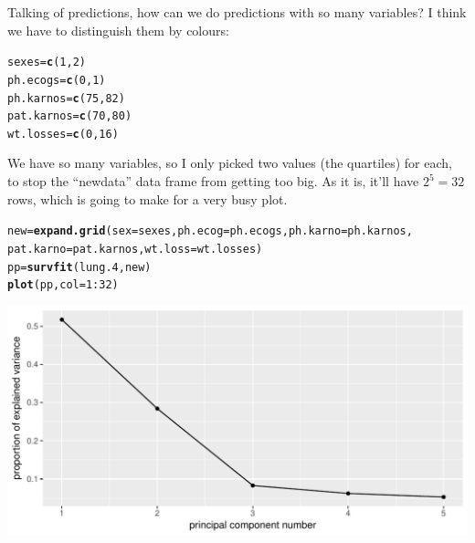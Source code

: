 \documentclass{article}\usepackage[]{graphicx}\usepackage[]{color}
\makeatletter
\def\maxwidth{ %
  \ifdim\Gin@nat@width>\linewidth
    \linewidth
  \else
    \Gin@nat@width
  \fi
}
\newcommand{\hlnum}[1]{\textcolor[rgb]{0.686,0.059,0.569}{#1}}%
\newcommand{\hlopt}[1]{\textcolor[rgb]{0,0,0}{#1}}%
\newcommand{\hlstd}[1]{\textcolor[rgb]{0.345,0.345,0.345}{#1}}%
\newcommand{\hlkwb}[1]{\textcolor[rgb]{0.69,0.353,0.396}{#1}}%
\newcommand{\hlkwc}[1]{\textcolor[rgb]{0.333,0.667,0.333}{#1}}%
\newcommand{\hlkwd}[1]{\textcolor[rgb]{0.737,0.353,0.396}{\textbf{#1}}}%
\newenvironment{kframe}{%
 \def\at@end@of@kframe{}%
 \ifinner\ifhmode%
  \def\at@end@of@kframe{\end{minipage}}%
  \begin{minipage}{\columnwidth}%
 \fi\fi%
 \def\FrameCommand##1{\hskip\@totalleftmargin \hskip-\fboxsep
 \colorbox{shadecolor}{##1}\hskip-\fboxsep
     \hskip-\linewidth \hskip-\@totalleftmargin \hskip\columnwidth}%
 \MakeFramed {\advance\hsize-\width
   \@totalleftmargin\z@ \linewidth\hsize
   \@setminipage}}%
 {\par\unskip\endMakeFramed%
 \at@end@of@kframe}
\newenvironment{knitrout}{}{} %
\makeatother
\begin{document}
Talking of predictions, how can we do predictions with so many
variables? I think we have to distinguish them by colours:

\begin{knitrout}
\color{fgcolor}\begin{kframe}
\begin{alltt}
\hlstd{sexes}\hlkwb{=}\hlkwd{c}\hlstd{(}\hlnum{1}\hlstd{,}\hlnum{2}\hlstd{)}
\hlstd{ph.ecogs}\hlkwb{=}\hlkwd{c}\hlstd{(}\hlnum{0}\hlstd{,}\hlnum{1}\hlstd{)}
\hlstd{ph.karnos}\hlkwb{=}\hlkwd{c}\hlstd{(}\hlnum{75}\hlstd{,}\hlnum{82}\hlstd{)}
\hlstd{pat.karnos}\hlkwb{=}\hlkwd{c}\hlstd{(}\hlnum{70}\hlstd{,}\hlnum{80}\hlstd{)}
\hlstd{wt.losses}\hlkwb{=}\hlkwd{c}\hlstd{(}\hlnum{0}\hlstd{,}\hlnum{16}\hlstd{)}
\end{alltt}
\end{kframe}
\end{knitrout}

We have so many variables, so I only picked two values (the quartiles) for each, to
stop the ``newdata'' data frame from getting too big. As it is, it'll
have $2^5=32$ rows, which is going to make for a very busy plot.

\begin{knitrout}
\color{fgcolor}\begin{kframe}
\begin{alltt}
\hlstd{new}\hlkwb{=}\hlkwd{expand.grid}\hlstd{(}\hlkwc{sex}\hlstd{=sexes,}\hlkwc{ph.ecog}\hlstd{=ph.ecogs,}\hlkwc{ph.karno}\hlstd{=ph.karnos,}
  \hlkwc{pat.karno}\hlstd{=pat.karnos,}\hlkwc{wt.loss}\hlstd{=wt.losses)}
\hlstd{pp}\hlkwb{=}\hlkwd{survfit}\hlstd{(lung.4,new)}
\hlkwd{plot}\hlstd{(pp,}\hlkwc{col}\hlstd{=}\hlnum{1}\hlopt{:}\hlnum{32}\hlstd{)}
\end{alltt}
\end{kframe}
\includegraphics[width=\maxwidth]{figure/unnamed-chunk-17-1} 

\end{knitrout}
\end{document}
